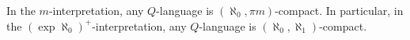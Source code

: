 In the $m$-interpretation, any $Q$-language is $(\aleph_0, \pi m)$-compact. In particular, in the $(\exp \aleph_0)^+$-interpretation, any $Q$-language is $(\aleph_0, \aleph_1)$-compact.
